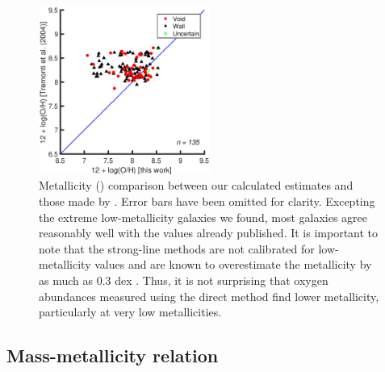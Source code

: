 \begin{figure}
    \centering
    \includegraphics[width=0.5\textwidth]{Images/Paper1/1sig_dwarf_I06_SF_t3_T04comparison}
    \caption[Metallicity comparison to \cite{Tremonti04}]{Metallicity (\OH) 
    comparison between our calculated estimates and those made by 
    \cite{Tremonti04}.  Error bars have been omitted for clarity.  Excepting the 
    extreme low-metallicity galaxies we found, most galaxies agree reasonably 
    well with the values already published.  It is important to note that the 
    strong-line methods \citep[like those used by][]{Tremonti04} are not 
    calibrated for low-metallicity values and are known to overestimate the 
    metallicity by as much as 0.3 dex \citep{Kennicutt03}.  Thus, it is not 
    surprising that oxygen abundances measured using the direct method find 
    lower metallicity, particularly at very low metallicities.}
    \label{fig:T04comp}
\end{figure}




\subsection{Mass-metallicity relation}

